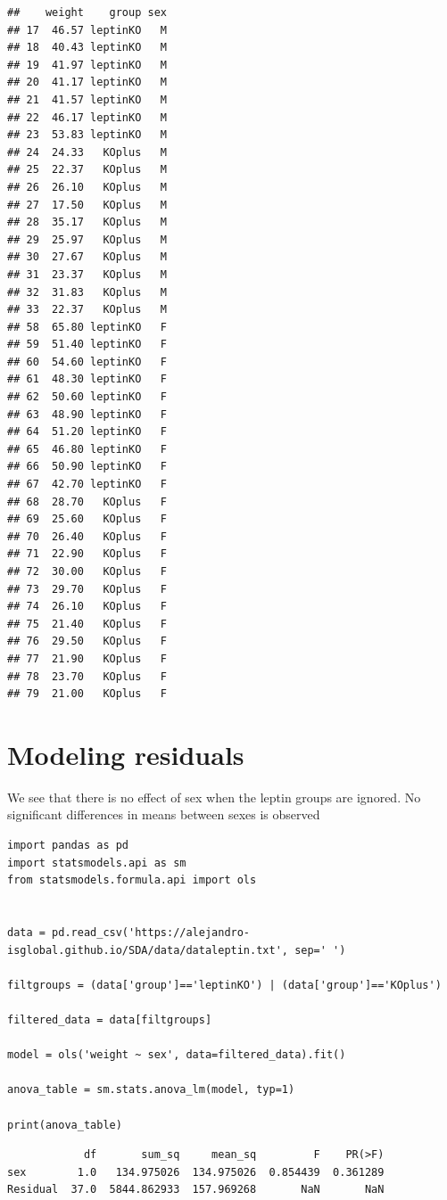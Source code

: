 \documentclass[
]{book}
\begin{document}
\begin{verbatim}
##    weight    group sex
## 17  46.57 leptinKO   M
## 18  40.43 leptinKO   M
## 19  41.97 leptinKO   M
## 20  41.17 leptinKO   M
## 21  41.57 leptinKO   M
## 22  46.17 leptinKO   M
## 23  53.83 leptinKO   M
## 24  24.33   KOplus   M
## 25  22.37   KOplus   M
## 26  26.10   KOplus   M
## 27  17.50   KOplus   M
## 28  35.17   KOplus   M
## 29  25.97   KOplus   M
## 30  27.67   KOplus   M
## 31  23.37   KOplus   M
## 32  31.83   KOplus   M
## 33  22.37   KOplus   M
## 58  65.80 leptinKO   F
## 59  51.40 leptinKO   F
## 60  54.60 leptinKO   F
## 61  48.30 leptinKO   F
## 62  50.60 leptinKO   F
## 63  48.90 leptinKO   F
## 64  51.20 leptinKO   F
## 65  46.80 leptinKO   F
## 66  50.90 leptinKO   F
## 67  42.70 leptinKO   F
## 68  28.70   KOplus   F
## 69  25.60   KOplus   F
## 70  26.40   KOplus   F
## 71  22.90   KOplus   F
## 72  30.00   KOplus   F
## 73  29.70   KOplus   F
## 74  26.10   KOplus   F
## 75  21.40   KOplus   F
## 76  29.50   KOplus   F
## 77  21.90   KOplus   F
## 78  23.70   KOplus   F
## 79  21.00   KOplus   F
\end{verbatim}

\hypertarget{modeling-residuals}{%
\section{Modeling residuals}\label{modeling-residuals}}

We see that there is no effect of sex when the leptin groups are ignored. No significant differences in means between sexes is observed

\begin{verbatim}
import pandas as pd
import statsmodels.api as sm
from statsmodels.formula.api import ols


data = pd.read_csv('https://alejandro-isglobal.github.io/SDA/data/dataleptin.txt', sep=' ')

filtgroups = (data['group']=='leptinKO') | (data['group']=='KOplus')

filtered_data = data[filtgroups]

model = ols('weight ~ sex', data=filtered_data).fit()

anova_table = sm.stats.anova_lm(model, typ=1)

print(anova_table)
\end{verbatim}

\begin{verbatim}
            df       sum_sq     mean_sq         F    PR(>F)
sex        1.0   134.975026  134.975026  0.854439  0.361289
Residual  37.0  5844.862933  157.969268       NaN       NaN
\end{verbatim}
\end{document}
